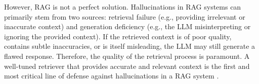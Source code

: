 However, RAG is not a perfect solution. Hallucinations in RAG systems can primarily stem from two sources: retrieval failure (e.g., providing irrelevant or inaccurate context) and generation deficiency (e.g., the LLM misinterpreting or ignoring the provided context). If the retrieved context is of poor quality, contains subtle inaccuracies, or is itself misleading, the LLM may still generate a flawed response. Therefore, the quality of the retrieval process is paramount. A well-tuned retriever that provides accurate and relevant context is the first and most critical line of defense against hallucinations in a RAG system \autocite{gao2024retrievalaugmented}.